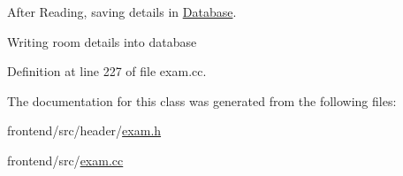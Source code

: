 \-After \-Reading, saving details in \hyperlink{classDatabase}{\-Database}. 

\-Writing room details into database 

\-Definition at line 227 of file exam.\-cc.



\-The documentation for this class was generated from the following files\-:\begin{DoxyCompactItemize}
\item 
frontend/src/header/\hyperlink{exam_8h}{exam.\-h}\item 
frontend/src/\hyperlink{exam_8cc}{exam.\-cc}\end{DoxyCompactItemize}
